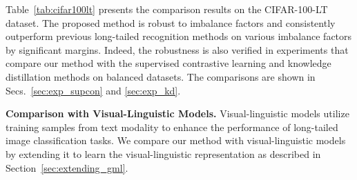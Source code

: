 \documentclass{article}
\theoremstyle{plain}
\theoremstyle{definition}
\theoremstyle{remark}
\begin{document}
Table~\ref{tab:cifar100lt} presents the comparison results on the CIFAR-100-LT dataset. The proposed method is robust to imbalance factors and consistently outperform previous long-tailed recognition methods on various imbalance factors by significant margins. Indeed, the robustness is also verified in experiments that compare our method with the supervised contrastive learning and knowledge distillation methods on balanced datasets. The comparisons are shown in Secs.~\ref{sec:exp_supcon} and \ref{sec:exp_kd}.


\textbf{Comparison with Visual-Linguistic Models.} Visual-linguistic models utilize training samples from text modality to enhance the performance of long-tailed image classification tasks. We compare our method with visual-linguistic models by extending it to learn the visual-linguistic representation as described in Section~\ref{sec:extending_gml}.
\end{document}
